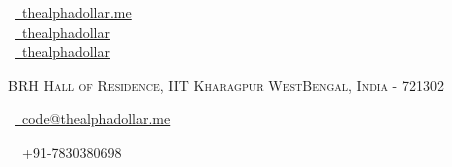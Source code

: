 \documentclass[a4paper,10pt]{extarticle} %
\begin{document}
\pagestyle{empty} %


\begin{multicols}{3}
\normalsize  \faGlobe\ {\href{https://thealphadollar.me/}{\  thealphadollar.me}}\\
\normalsize \faGithub\ {\href{https://github.com/thealphadollar}{\  thealphadollar}}\\
\normalsize  \faLinkedinSquare\ {\href{https://www.linkedin.com/in/thealphadollar}{\  thealphadollar}}\\
\columnbreak
\normalsize\par{\centering{\huge\textsc{\textcolor{primary}{Shivam Kumar Jha}}}\par} %
\par{\centering\normalsize {\textsc{BRH Hall of Residence, IIT Kharagpur WestBengal, India - 721302}}\hfill\par}
\columnbreak
\raggedright\hfill\normalsize \faEnvelope\ {\href{mailto:code@thealphadollar.me}{\  code@thealphadollar.me}}\\
\raggedright\hfill{\faPhone\ \  +91-7830380698}
\end{multicols}
\vspace{-0.4 cm}

\end{document}
